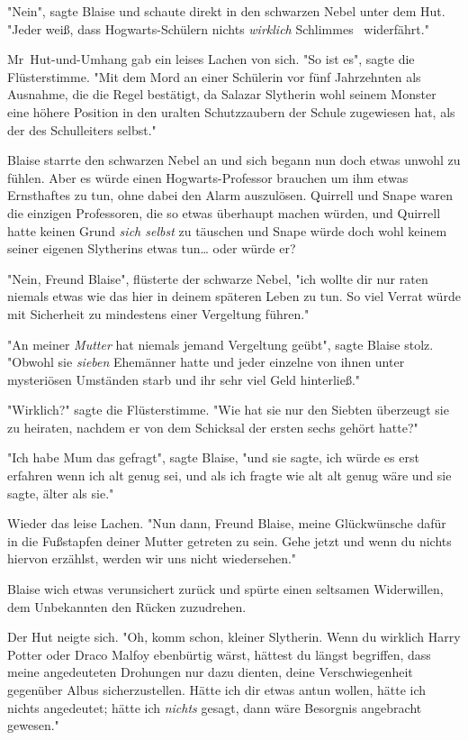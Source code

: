 {"Nein", sagte Blaise und schaute direkt in den schwarzen Nebel unter dem Hut. "Jeder weiß, dass Hogwarts-Schülern nichts \emph{wirklich} Schlimmes ~widerfährt."

Mr~Hut-und-Umhang gab ein leises Lachen von sich. "So ist es", sagte die Flüsterstimme. "Mit dem Mord an einer Schülerin vor fünf Jahrzehnten als Ausnahme, die die Regel bestätigt, da Salazar Slytherin wohl seinem Monster eine höhere Position in den uralten Schutzzaubern der Schule zugewiesen hat, als der des Schulleiters selbst."

Blaise starrte den schwarzen Nebel an und sich begann nun doch etwas unwohl zu fühlen. Aber es würde einen Hogwarts-Professor brauchen um ihm etwas Ernsthaftes zu tun, ohne dabei den Alarm auszulösen. Quirrell und Snape waren die einzigen Professoren, die so etwas überhaupt machen würden, und Quirrell hatte keinen Grund \emph{sich selbst} zu täuschen und Snape würde doch wohl keinem seiner eigenen Slytherins etwas tun… oder würde er?

"Nein, Freund Blaise", flüsterte der schwarze Nebel, "ich wollte dir nur raten niemals etwas wie das hier in deinem späteren Leben zu tun. So viel Verrat würde mit Sicherheit zu mindestens einer Vergeltung führen."

"An meiner \emph{Mutter} hat niemals jemand Vergeltung geübt", sagte Blaise stolz. "Obwohl sie \emph{sieben} Ehemänner hatte und jeder einzelne von ihnen unter mysteriösen Umständen starb und ihr sehr viel Geld hinterließ."

"Wirklich?" sagte die Flüsterstimme. "Wie hat sie nur den Siebten überzeugt sie zu heiraten, nachdem er von dem Schicksal der ersten sechs gehört hatte?"

"Ich habe Mum das gefragt", sagte Blaise, "und sie sagte, ich würde es erst erfahren wenn ich alt genug sei, und als ich fragte wie alt alt genug wäre und sie sagte, älter als sie."

Wieder das leise Lachen. "Nun dann, Freund Blaise, meine Glückwünsche dafür in die Fußstapfen deiner Mutter getreten zu sein. Gehe jetzt und wenn du nichts hiervon erzählst, werden wir uns nicht wiedersehen."

Blaise wich etwas verunsichert zurück und spürte einen seltsamen Widerwillen, dem Unbekannten den Rücken zuzudrehen.

Der Hut neigte sich. "Oh, komm schon, kleiner Slytherin. Wenn du wirklich Harry Potter oder Draco Malfoy ebenbürtig wärst, hättest du längst begriffen, dass meine angedeuteten Drohungen nur dazu dienten, deine Verschwiegenheit gegenüber Albus sicherzustellen. Hätte ich dir etwas antun wollen, hätte ich nichts angedeutet; hätte ich \emph{nichts} gesagt, dann wäre Besorgnis angebracht gewesen."

}
